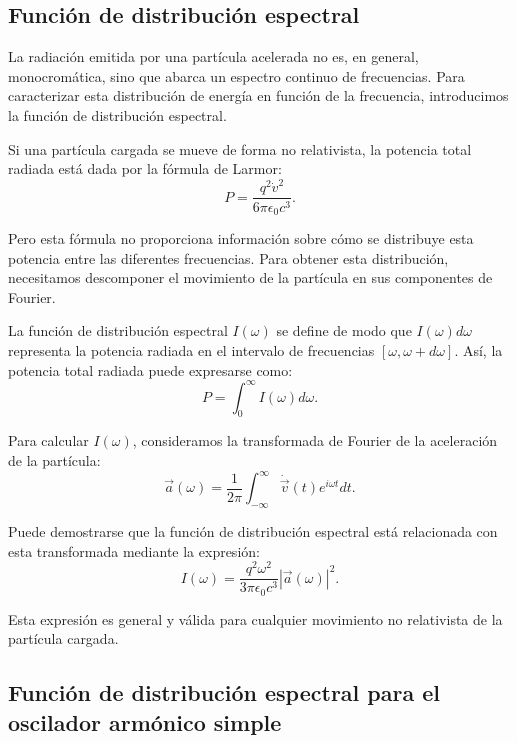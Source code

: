 \documentclass[12pt,a4paper]{book}
\begin{document}
\subsection{Función de distribución espectral}

La radiación emitida por una partícula acelerada no es, en general, monocromática, sino que abarca un espectro continuo de frecuencias. Para caracterizar esta distribución de energía en función de la frecuencia, introducimos la función de distribución espectral.

Si una partícula cargada se mueve de forma no relativista, la potencia total radiada está dada por la fórmula de Larmor:
\begin{equation}
P = \frac{q^2\dot{v}^2}{6\pi\epsilon_0c^3}.
\end{equation}

Pero esta fórmula no proporciona información sobre cómo se distribuye esta potencia entre las diferentes frecuencias. Para obtener esta distribución, necesitamos descomponer el movimiento de la partícula en sus componentes de Fourier.

La función de distribución espectral $I(\omega)$ se define de modo que $I(\omega)d\omega$ representa la potencia radiada en el intervalo de frecuencias $[\omega, \omega + d\omega]$. Así, la potencia total radiada puede expresarse como:
\begin{equation}
P = \int_0^{\infty} I(\omega) d\omega.
\end{equation}

Para calcular $I(\omega)$, consideramos la transformada de Fourier de la aceleración de la partícula:
\begin{equation}
\vec{a}(\omega) = \frac{1}{2\pi}\int_{-\infty}^{\infty}\dot{\vec{v}}(t)e^{i\omega t}dt.
\end{equation}

Puede demostrarse que la función de distribución espectral está relacionada con esta transformada mediante la expresión:
\begin{equation}
I(\omega) = \frac{q^2\omega^2}{3\pi\epsilon_0c^3}|\vec{a}(\omega)|^2.
\end{equation}

Esta expresión es general y válida para cualquier movimiento no relativista de la partícula cargada.

\subsection{Función de distribución espectral para el oscilador armónico simple}
\end{document}
